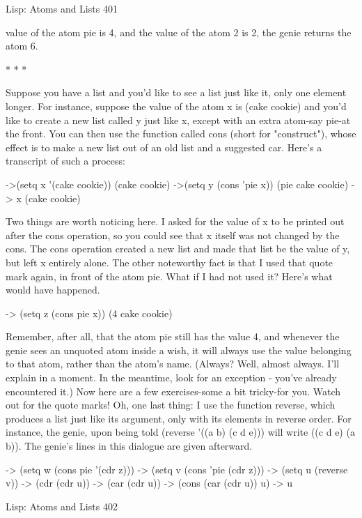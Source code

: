 Lisp: Atoms and Lists                                                                   401

value of the atom pie is 4, and the value of the atom 2 is 2, the genie returns the atom
6.

                                        *   *   *

        Suppose you have a list and you'd like to see a list just like it, only one
element longer. For instance, suppose the value of the atom x is (cake cookie) and
you'd like to create a new list called y just like x, except with an extra atom-say pie-at
the front. You can then use the function called cons (short for "construct"), whose
effect is to make a new list out of an old list and a suggested car. Here's a transcript of
such a process:

->(setq x '(cake cookie))
(cake cookie)
->(setq y (cons 'pie x))
(pie cake cookie)
-> x
(cake cookie)

        Two things are worth noticing here. I asked for the value of x to be printed out
after the cons operation, so you could see that x itself was not changed by the cons.
The cons operation created a new list and made that list be the value of y, but left x
entirely alone. The other noteworthy fact is that I used that quote mark again, in front
of the atom pie. What if I had not used it? Here's what would have happened.

-> (setq z (cons pie x))
(4 cake cookie)

Remember, after all, that the atom pie still has the value 4, and whenever the genie
sees an unquoted atom inside a wish, it will always use the value belonging to that
atom, rather than the atom's name. (Always? Well, almost always. I'll explain in a
moment. In the meantime, look for an exception - you've already encountered it.)
         Now here are a few exercises-some a bit tricky-for you. Watch out for the
quote marks! Oh, one last thing: I use the function reverse, which produces a list just
like its argument, only with its elements in reverse order. For instance, the genie, upon
being told (reverse '((a b) (c d e))) will write ((c d e) (a b)). The genie's lines in this
dialogue are given afterward.

-> (setq w (cons pie '(cdr z)))
-> (setq v (cons 'pie (cdr z)))
-> (setq u (reverse v))
-> (cdr (cdr u))
-> (car (cdr u))
-> (cons (car (cdr u)) u)
-> u




Lisp: Atoms and Lists                                                                  402


